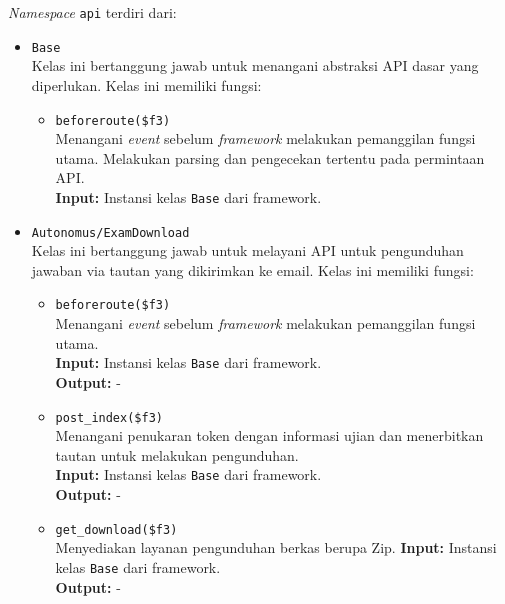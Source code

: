     \textit{Namespace} \texttt{api} terdiri dari:
    \begin{itemize}
        \item \texttt{Base} \\
            Kelas ini bertanggung jawab untuk menangani abstraksi API dasar yang diperlukan.
            Kelas ini memiliki fungsi:
            \begin{itemize}
                \item \texttt{beforeroute(\$f3)} \\
                    Menangani \textit{event} sebelum \textit{framework} melakukan pemanggilan
                    fungsi utama. Melakukan parsing dan pengecekan tertentu pada permintaan 
                    API.\\
                    \textbf{Input:} Instansi kelas \texttt{Base} dari framework.\\
            \end{itemize}
    
        \item \texttt{Autonomus/ExamDownload} \\
            Kelas ini bertanggung jawab untuk melayani API untuk pengunduhan jawaban
            via tautan yang dikirimkan ke email. Kelas ini memiliki fungsi:
            \begin{itemize}
                \item \texttt{beforeroute(\$f3)} \\
                    Menangani \textit{event} sebelum \textit{framework} melakukan pemanggilan
                    fungsi utama.\\
                    \textbf{Input:} Instansi kelas \texttt{Base} dari framework.\\
                    \textbf{Output:} -\\
                
                \item \texttt{post\_index(\$f3)} \\
                    Menangani penukaran token dengan informasi ujian dan menerbitkan tautan
                    untuk melakukan pengunduhan.\\
                    \textbf{Input:} Instansi kelas \texttt{Base} dari framework.\\
                    \textbf{Output:} -\\
                
                \item \texttt{get\_download(\$f3)} \\
                    Menyediakan layanan pengunduhan berkas berupa Zip.
                    \textbf{Input:} Instansi kelas \texttt{Base} dari framework.\\
                    \textbf{Output:} -\\
            \end{itemize}
            

\end{itemize}
